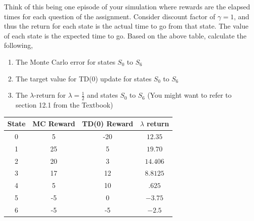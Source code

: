 \documentclass[12pt]{article}
\begin{document}
Think of this being one episode of your simulation where rewards are the elapsed times for each question of the assignment. Consider discount factor of $\gamma = 1$, and thus the return for each state is the actual time to go from that state. The value of each state is the expected time to go. Based on the above table, calculate the following,
\begin{enumerate}
    \item The Monte Carlo error for states $S_0$ to $S_6$
    \item The target value for TD(0) update for states $S_0$ to $S_6$
    \item The $\lambda$-return for $\lambda = \frac{1}{2}$ and states $S_0$ to $S_6$ (You might want to refer to section 12.1 from the Textbook)
\end{enumerate}

\begin{solution}
\begin{tabular}{|c|c|c|c|}
\hline
State & MC Reward & TD(0) Reward & $\lambda$ return\\
\hline
0&5&-20&$12.35$\\
\hline
1&25&5&$19.70$\\
\hline
2&20&3&$14.406$\\
\hline
3&17&12&$8.8125$\\
\hline
4&5&10&$.625$\\
\hline
5&-5&0&$-3.75$\\
\hline
6&-5&-5&$-2.5$\\
\hline
\end{tabular}
\end{solution}

\end{document}
